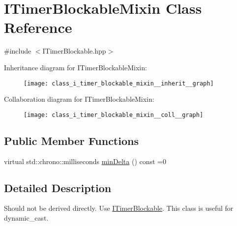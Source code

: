 \hypertarget{class_i_timer_blockable_mixin}{\section{I\-Timer\-Blockable\-Mixin Class Reference}
\label{class_i_timer_blockable_mixin}
}


{\ttfamily \#include $<$I\-Timer\-Blockable.\-hpp$>$}



Inheritance diagram for I\-Timer\-Blockable\-Mixin\-:
\nopagebreak
\begin{figure}[H]
\begin{center}
\leavevmode
\texttt{[image: class\_i\_timer\_blockable\_mixin\_\_inherit\_\_graph]}
\end{center}
\end{figure}


Collaboration diagram for I\-Timer\-Blockable\-Mixin\-:
\nopagebreak
\begin{figure}[H]
\begin{center}
\leavevmode
\texttt{[image: class\_i\_timer\_blockable\_mixin\_\_coll\_\_graph]}
\end{center}
\end{figure}
\subsection*{Public Member Functions}
\begin{DoxyCompactItemize}
\item 
virtual std\-::chrono\-::milliseconds \hyperlink{class_i_timer_blockable_mixin_a9480f79463ced5d05c05bd0dff939442}{min\-Delta} () const =0
\end{DoxyCompactItemize}


\subsection{Detailed Description}
Should not be derived directly. Use {\ttfamily \hyperlink{class_i_timer_blockable}{I\-Timer\-Blockable}}. This class is useful for {\ttfamily dynamic\-\_\-cast}. 

